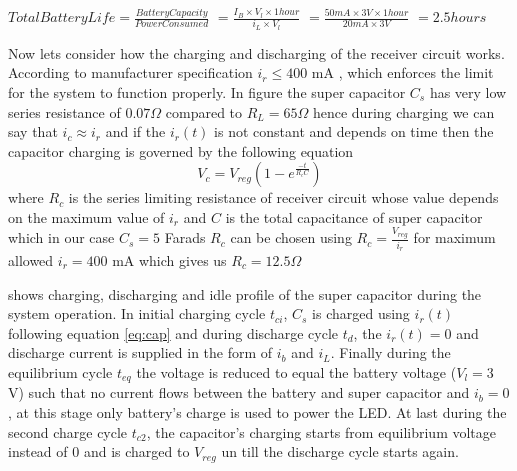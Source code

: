  $Total Battery Life = \frac{Battery Capacity}{Power Consumed}$
                    $= \frac{I_B \times V_l \times 1 hour}{i_L \times V_l}$
                    $= \frac{50mA \times 3V \times 1 hour}{20mA \times 3V}$
                    $= 2.5 hours$


Now lets consider how the charging and discharging of the receiver circuit works. According to manufacturer specification $i_r \leq 400 $ mA , which enforces the limit for the system to function properly.
In figure %
the super capacitor $C_s$ has very low series resistance of $0.07 \Omega$ compared to $R_L = 65 \Omega$ hence during charging we can say that $i_c \approx i_r$ and if the $i_r(t)$ is not constant and depends on time then the capacitor charging is governed by the following equation
\begin{equation}\label{eq:cap}
 V_c = V_{reg} \left(1 - e^{\frac{-t}{R_cC}}\right)
\end{equation}
where $R_c$ is the series limiting resistance of receiver circuit whose value depends on the maximum value of $i_r$ and $C$ is the total capacitance of super capacitor which in our case $C_s = 5 $ Farads
$R_c$ can be chosen using $R_c = \frac { V_{reg}}{i_r} $ for maximum allowed $i_r = 400$ mA which gives us $R_c = 12.5 \Omega$



shows charging, discharging and idle profile of the super capacitor during the system operation. In initial charging cycle $t_{ci}$, $C_s$ is charged using $i_r(t)$ following equation \ref{eq:cap} and during discharge cycle $t_d$, the $i_r(t) = 0$ and discharge current is supplied in the form of $i_b$ and $i_L$. Finally during the equilibrium cycle $t_{eq}$ the voltage is reduced to equal the battery voltage ($V_l = 3$ V) such that no current flows between the battery and super capacitor and $i_b = 0$, at this stage only battery's charge is used to power the LED. At last during the second charge cycle $t_{c2}$, the capacitor's charging starts from equilibrium voltage instead of 0 and is charged to $V_{reg}$ un till the discharge cycle starts again.
